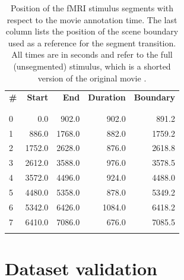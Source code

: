 \documentclass[10pt,a4paper,twocolumn]{article}
\begin{document}
\begin{table}
  \centering
  \begin{tabular}{lrrrr}
    \textbf{\#}  & \textbf{Start}  & \textbf{End}    & \textbf{Duration}& \textbf{Boundary} \\
  \\\hline\\
   0  & 0.0    & 902.0  & 902.0  & 891.2    \\
   1  & 886.0  & 1768.0 & 882.0  & 1759.2   \\
   2  & 1752.0 & 2628.0 & 876.0  & 2618.8   \\
   3  & 2612.0 & 3588.0 & 976.0  & 3578.5   \\
   4  & 3572.0 & 4496.0 & 924.0  & 4488.0   \\
   5  & 4480.0 & 5358.0 & 878.0  & 5349.2   \\
   6  & 5342.0 & 6426.0 & 1084.0 & 6418.2   \\
   7  & 6410.0 & 7086.0 & 676.0  & 7085.5   \\
   \\\hline
  \end{tabular}

  \caption{Position of the fMRI stimulus segments with respect to the movie
    annotation time. The last column lists the position of the scene boundary
    used as a reference for the segment transition. All times are in seconds
    and refer to the full (unsegmented) stimulus, which is a shorted version of
    the original movie \cite{HBI+14}.}

  \label{tab:timing}
\end{table}

\section*{Dataset validation}

\end{document}
